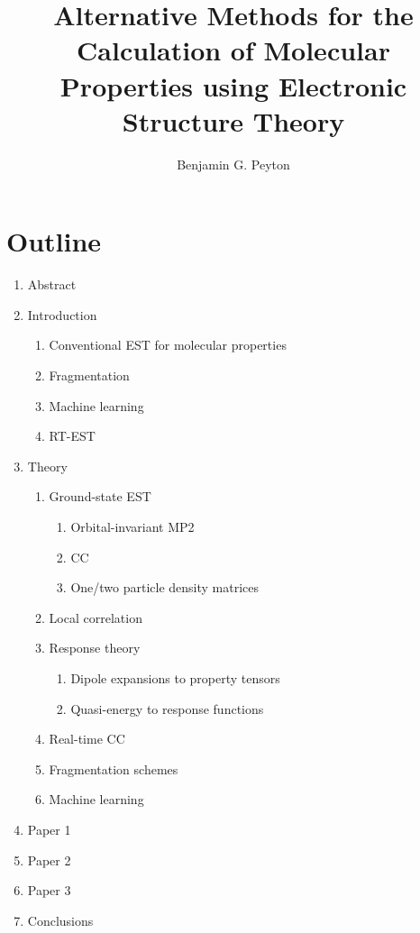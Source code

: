 \documentclass[journal=jpcafh]{achemso}
\title{Alternative Methods for the Calculation of Molecular Properties using Electronic Structure Theory}
\author{Benjamin G. Peyton}
\affiliation{Department of Chemistry, Virginia Tech, Blacksburg, VA 24061, USA}
\begin{document}
\section*{Outline} \label{outline}
\begin{enumerate}
    \item Abstract
    \item Introduction
        \begin{enumerate}
            \item Conventional EST for molecular properties
            \item Fragmentation
            \item Machine learning
            \item RT-EST
        \end{enumerate}
    \item Theory
        \begin{enumerate}
            \item Ground-state EST 
                \begin{enumerate}
                    \item Orbital-invariant MP2
                    \item CC
                    \item One/two particle density matrices
                \end{enumerate}
            \item Local correlation
            \item Response theory
                \begin{enumerate}
                    \item Dipole expansions to property tensors 
                    \item Quasi-energy to response functions
                \end{enumerate}
            \item Real-time CC
            \item Fragmentation schemes
            \item Machine learning
        \end{enumerate}
    \item Paper 1 
    \item Paper 2 
    \item Paper 3 
    \item Conclusions
\end{enumerate}
\end{document}
